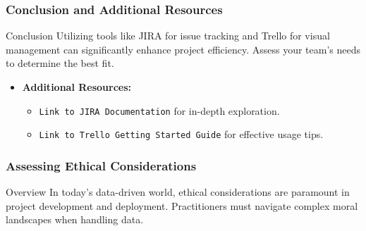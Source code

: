 \documentclass[aspectratio=169]{beamer}
\begin{document}
\begin{frame}[fragile]
    \frametitle{Conclusion and Additional Resources}
    \begin{block}{Conclusion}
        Utilizing tools like JIRA for issue tracking and Trello for visual management can significantly enhance project efficiency.
        Assess your team's needs to determine the best fit.
    \end{block}
    \begin{itemize}
        \item \textbf{Additional Resources:}
        \begin{itemize}
            \item \texttt{Link to JIRA Documentation} for in-depth exploration.
            \item \texttt{Link to Trello Getting Started Guide} for effective usage tips.
        \end{itemize}
    \end{itemize}
\end{frame}

\begin{frame}[fragile]
    \frametitle{Assessing Ethical Considerations}
    \begin{block}{Overview}
        In today's data-driven world, ethical considerations are paramount in project development and deployment. 
        Practitioners must navigate complex moral landscapes when handling data.
    \end{block}
\end{frame}
\end{document}
